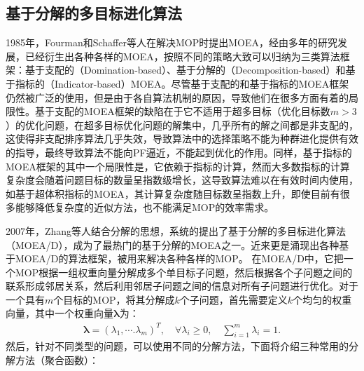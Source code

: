 \subsection{基于分解的多目标进化算法}
\label{subsec:背景介绍:多目标组合优化算法:基于分解的多目标进化算法}
1985年，Fourman和Schaffer等人在解决MOP时提出MOEA\cite{fourman1985compaction,schaffer1985multiple}，经由多年的研究发展，已经衍生出各种各样的MOEA，按照不同的策略大致可以归纳为三类算法框架：基于支配的（Domination-based）、基于分解的（Decomposition-based）和基于指标的（Indicator-based）MOEA。尽管基于支配的和基于指标的MOEA框架仍然被广泛的使用，但是由于各自算法机制的原因，导致他们在很多方面有着的局限性。基于支配的MOEA框架的缺陷在于它不适用于超多目标（优化目标数$m > 3$）的优化问题，在超多目标优化问题的解集中，几乎所有的解之间都是非支配的，这使得非支配排序算法几乎失效，导致算法中的选择策略不能为种群进化提供有效的指导，最终导致算法不能向PF逼近，不能起到优化的作用\cite{ishibuchi2008behavior,giagkiozis2015methods}。同样，基于指标的MOEA框架的其中一个局限性是，它依赖于指标的计算，然而大多数指标的计算复杂度会随着问题目标的数量呈指数级增长，这导致算法难以在有效时间内使用，如基于超体积指标的MOEA，其计算复杂度随目标数呈指数上升，即使目前有很多能够降低复杂度的近似方法，也不能满足MOP的效率需求。
\par
2007年，Zhang等人结合分解的思想，系统的提出了基于分解的多目标进化算法（MOEA/D）\cite{zhang2007moea}，成为了最热门的基于分解的MOEA之一。近来更是涌现出各种基于MOEA/D的算法框架，被用来解决各种各样的MOP\cite{ke2013moea,ke2014hybridization}。
在MOEA/D中，它把一个MOP根据一组权重向量分解成多个单目标子问题，然后根据各个子问题之间的联系形成邻居关系，然后利用邻居子问题之间的信息对所有子问题进行优化。对于一个具有$m$个目标的MOP，将其分解成$k$个子问题，首先需要定义$k$个均匀的权重向量，其中一个权重向量$\boldsymbol{\lambda}$为：
\begin{align}
    \label{eq:背景介绍:权重向量}
    \boldsymbol{\lambda} = (\lambda_1, \cdots. \lambda_m)^T, \quad \forall \lambda_i \geq 0 , \quad \sum_{i=1}^m \lambda_i = 1. 
\end{align}
然后，针对不同类型的问题，可以使用不同的分解方法，下面将介绍三种常用的分解方法（聚合函数）：
\par
